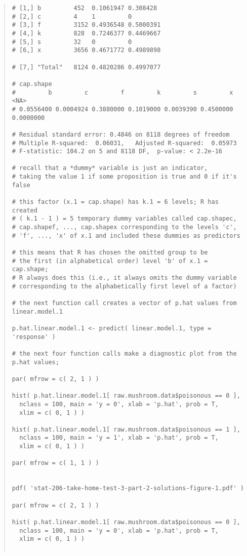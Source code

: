 \documentclass[12pt]{article}
\begin{document}
\begin{quote}
\begin{verbatim}
# [1,] b         452  0.1061947 0.308428 
# [2,] c         4    1         0        
# [3,] f         3152 0.4936548 0.5000391
# [4,] k         828  0.7246377 0.4469667
# [5,] s         32   0         0        
# [6,] x         3656 0.4671772 0.4989898

# [7,] "Total"   8124 0.4820286 0.4997077

# cap.shape
#         b         c         f         k         s         x      <NA> 
# 0.0556400 0.0004924 0.3880000 0.1019000 0.0039390 0.4500000 0.0000000

# Residual standard error: 0.4846 on 8118 degrees of freedom
# Multiple R-squared:  0.06031,   Adjusted R-squared:  0.05973 
# F-statistic: 104.2 on 5 and 8118 DF,  p-value: < 2.2e-16

# recall that a *dummy* variable is just an indicator,
# taking the value 1 if some proposition is true and 0 if it's false

# this factor (x.1 = cap.shape) has k.1 = 6 levels; R has created 
# ( k.1 - 1 ) = 5 temporary dummy variables called cap.shapec,
# cap.shapef, ..., cap.shapex corresponding to the levels 'c',
# 'f', ..., 'x' of x.1 and included these dummies as predictors

# this means that R has chosen the omitted group to be 
# the first (in alphabetical order) level 'b' of x.1 = cap.shape;
# R always does this (i.e., it always omits the dummy variable
# corresponding to the alphabetically first level of a factor)

# the next function call creates a vector of p.hat values from linear.model.1

p.hat.linear.model.1 <- predict( linear.model.1, type = 'response' )

# the next four function calls make a diagnostic plot from the p.hat values;

par( mfrow = c( 2, 1 ) )

hist( p.hat.linear.model.1[ raw.mushroom.data$poisonous == 0 ],
  nclass = 100, main = 'y = 0', xlab = 'p.hat', prob = T,
  xlim = c( 0, 1 ) )

hist( p.hat.linear.model.1[ raw.mushroom.data$poisonous == 1 ],
  nclass = 100, main = 'y = 1', xlab = 'p.hat', prob = T,
  xlim = c( 0, 1 ) )

par( mfrow = c( 1, 1 ) )


pdf( 'stat-206-take-home-test-3-part-2-solutions-figure-1.pdf' )

par( mfrow = c( 2, 1 ) )

hist( p.hat.linear.model.1[ raw.mushroom.data$poisonous == 0 ],
  nclass = 100, main = 'y = 0', xlab = 'p.hat', prob = T,
  xlim = c( 0, 1 ) )


\end{verbatim}
\end{quote}
\end{document}
